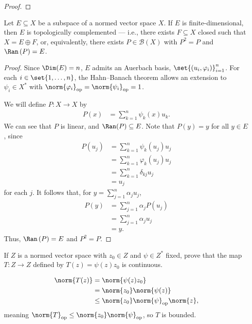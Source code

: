 \documentclass[10pt]{mypackage}
\begin{document}
\begin{proof}
\end{proof}
\begin{proposition}
  Let $E\subseteq X$ be a subspace of a normed vector space $X$. If $E$ is finite-dimensional, then $E$ is topologically complemented --- i.e., there exists $F\subseteq X$ closed such that $X = E\oplus F$, or, equivalently, there exists $P\in \mathcal{B}\left(X\right)$ with $P^2 = P$ and $\Ran\left(P\right) = E$.
\end{proposition}
\begin{proof}
  Since $\Dim(E) = n$, $E$ admits an Auerbach basis, $\set{\left(u_i,\varphi_i\right)}_{i=1}^{n}$. For each $i \in \set{1,\dots,n}$, the Hahn--Banach theorem allows an extension to $\psi_i\in X^{\ast}$ with $\norm{\varphi_i}_{\text{op}} = \norm{\psi_i}_{\text{op}} = 1$.\newline

  We will define $P: X\rightarrow X$ by
  \begin{align*}
    P(x) &= \sum_{k=1}^{n}\psi_k(x)u_k.
  \end{align*}
  We can see that $P$ is linear, and $\Ran(P) \subseteq E$. Note that $P(y) = y$ for all $y\in E$, since
  \begin{align*}
    P\left(u_j\right) &= \sum_{k=1}^{n}\psi_k\left(u_j\right)u_j\\
                      &= \sum_{k=1}^{n}\varphi_k\left(u_j\right)u_j\\
                      &= \sum_{k=1}^{n}\delta_{kj}u_j\\
                      &= u_j
  \end{align*}
  for each $j$. It follows that, for $y = \sum_{j=1}^{n}\alpha_ju_j$,
  \begin{align*}
    P\left(y\right) &= \sum_{j=1}^{n}\alpha_jP\left(u_j\right)\\
                    &= \sum_{j=1}^{n}\alpha_ju_j\\
                    &= y.
  \end{align*}
  Thus, $\Ran\left(P\right) = E$ and $P^2 = P$.
\end{proof}
\begin{exercise}
  If $Z$ is a normed vector space with $z_0\in Z$ and $\psi\in Z^{\ast}$ fixed, prove that the map $T: Z\rightarrow Z$ defined by $T(z) = \psi(z)z_0$ is continuous.
\end{exercise}
\begin{solution}
  \begin{align*}
    \norm{T(z)} &= \norm{\psi(z)z_0}\\
                &= \norm{z_0}\norm{\psi(z)}\\
                &\leq \norm{z_0}\norm{\psi}_{\text{op}}\norm{z},
  \end{align*}
  meaning $\norm{T}_{\text{op}}\leq \norm{z_0}\norm{\psi}_{\text{op}}$, so $T$ is bounded.
\end{solution}
\end{document}
